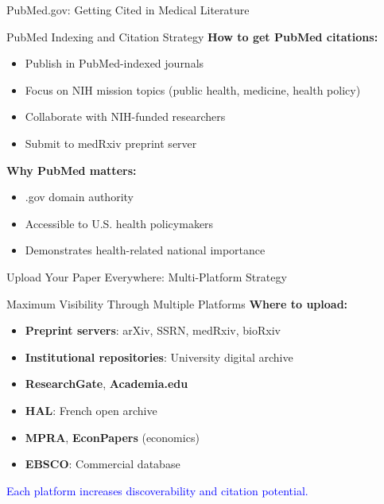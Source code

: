 \documentclass[11pt]{beamer}
\begin{document}
	\begin{frame}{PubMed.gov: Getting Cited in Medical Literature}
		\small
		\begin{block}{PubMed Indexing and Citation Strategy}
			\textbf{How to get PubMed citations:}
			\begin{itemize}
				\item Publish in PubMed-indexed journals
				\item Focus on NIH mission topics (public health, medicine, health policy)
				\item Collaborate with NIH-funded researchers
				\item Submit to medRxiv preprint server
			\end{itemize}
			\textbf{Why PubMed matters:}
			\begin{itemize}
				\item .gov domain authority
				\item Accessible to U.S. health policymakers
				\item Demonstrates health-related national importance
			\end{itemize}
		\end{block}
	\end{frame}
	
	
	\begin{frame}{Upload Your Paper Everywhere: Multi-Platform Strategy}
		\small
		\begin{block}{Maximum Visibility Through Multiple Platforms}
			\textbf{Where to upload:}
			\begin{itemize}
				\item \textbf{Preprint servers}: arXiv, SSRN, medRxiv, bioRxiv
				\item \textbf{Institutional repositories}: University digital archive
				\item \textbf{ResearchGate}, \textbf{Academia.edu}
				\item \textbf{HAL}: French open archive
				\item \textbf{MPRA}, \textbf{EconPapers} (economics)
				\item \textbf{EBSCO}: Commercial database
			\end{itemize}
			\textcolor{blue}{Each platform increases discoverability and citation potential.}
		\end{block}
	\end{frame}
	
\end{document}
